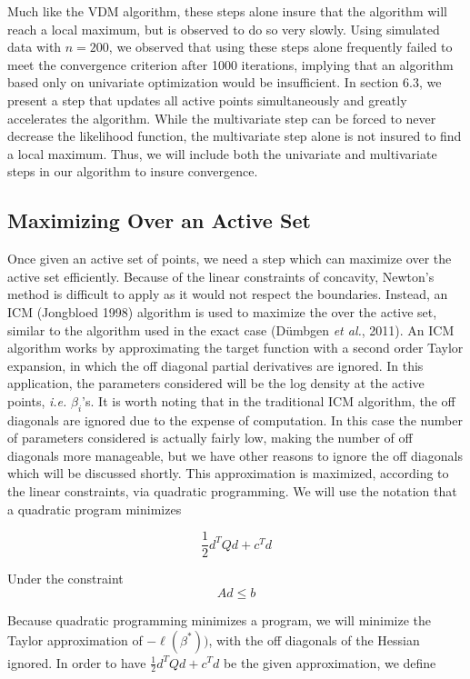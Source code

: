 	Much like the VDM algorithm, these steps alone insure that the algorithm will reach a local maximum, but is observed to do so very slowly. Using simulated data with $n = 200$, we observed that using these steps alone frequently failed to meet the convergence criterion after 1000 iterations, implying that an algorithm based only on univariate optimization would be insufficient. In section 6.3, we present a step that updates all active points simultaneously and greatly accelerates the algorithm. While the multivariate step can be forced to never decrease the likelihood function, the multivariate step alone is not insured to find a local maximum. Thus, we will include both the univariate and multivariate steps in our algorithm to insure convergence. 
	
	{\subsection{Maximizing Over an Active Set} }
	
	Once given an active set of points, we need a step which can  maximize over the active set efficiently. Because of the linear constraints of concavity, Newton's method is difficult to apply as it would not respect the boundaries. Instead, an ICM (Jongbloed 1998) algorithm is used to maximize the over the active set, similar to the algorithm used in the exact case (D\"umbgen \emph{et al.}, 2011). An ICM algorithm works by approximating the target function with a second order Taylor expansion, in which the off diagonal partial derivatives are ignored. In this application, the parameters considered will be the log density at the active points, \emph{i.e.} $\beta_i$'s. It is worth noting that in the traditional ICM algorithm, the off diagonals are ignored due to the expense of computation. In this case the number of parameters considered  is actually fairly low, making the number of off diagonals more manageable, but we have other reasons to ignore the off diagonals which will be discussed shortly. This approximation is maximized, according to the linear constraints, via quadratic programming. We will use the notation that a quadratic program minimizes
	
	\[ \frac{1}{2} d^T Q d + c^T d
	\]
	
	Under the constraint \[ A d \leq b\]
	
	Because quadratic programming minimizes a program, we will minimize the Taylor approximation of $-\ell(\beta^*))$, with the off diagonals of the Hessian ignored. In order to have $\frac{1}{2} d^T Q d + c^T d$ be the given approximation, we define
	
